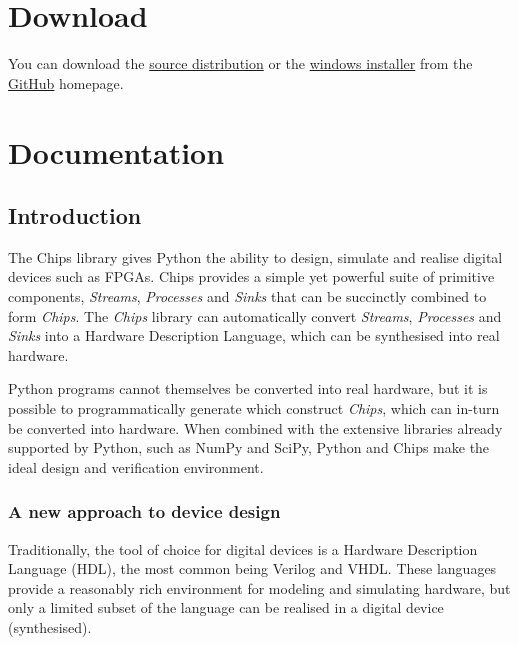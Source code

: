 \documentclass[letterpaper,10pt,english]{manual}
\begin{document}
\chapter{Download}

You can download the \href{https://github.com/downloads/dawsonjon/chips/Chips-0.1.tar.gz}{source distribution} or the \href{https://github.com/downloads/dawsonjon/chips/Chips-0.1.win32.exe}{windows  installer} from
the \href{http://github.com/dawsonjon/chips/}{GitHub} homepage.


\chapter{Documentation}

\resetcurrentobjects
\hypertarget{--doc-introduction/index}{}

\section{Introduction}

The Chips library gives Python the ability to design, simulate and realise
digital devices such as FPGAs. Chips provides a simple yet powerful suite of
primitive components, \emph{Streams}, \emph{Processes} and \emph{Sinks} that can be
succinctly combined to form \emph{Chips}. The \emph{Chips} library can automatically
convert \emph{Streams}, \emph{Processes} and \emph{Sinks} into a Hardware Description
Language, which can be synthesised into real hardware.

Python programs cannot themselves be converted into real hardware, but it is
possible to programmatically generate which construct \emph{Chips}, which can
in-turn be converted into hardware. When combined with the extensive
libraries already supported by Python, such as NumPy and SciPy, Python and
Chips make the ideal design and verification environment.


\subsection{A new approach to device design}

Traditionally, the tool of choice for digital devices is a Hardware
Description Language (HDL), the most common being Verilog and VHDL. These
languages provide a reasonably rich environment for modeling and simulating
hardware, but only a limited subset of the language can be realised in a
digital device (synthesised).
\end{document}
